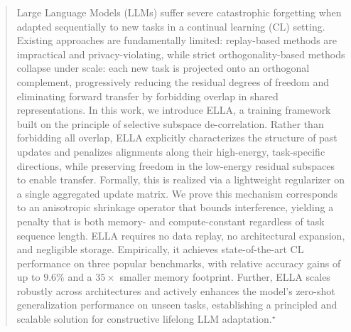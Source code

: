 \documentclass[11pt]{article}
\begin{document}
\begin{abstract}
Large Language Models (LLMs) suffer severe catastrophic forgetting when adapted sequentially to new tasks in a continual learning (CL) setting. Existing approaches are fundamentally limited: replay-based methods are impractical and privacy-violating, while strict orthogonality-based methods collapse under scale: each new task is projected onto an orthogonal complement, progressively reducing the residual degrees of freedom and eliminating forward transfer by forbidding overlap in shared representations. In this work, we introduce ELLA, a training framework built on the principle of selective subspace de-correlation. Rather than forbidding all overlap, ELLA explicitly characterizes the structure of past updates and penalizes alignments along their high-energy, task-specific directions, while preserving freedom in the low-energy residual subspaces to enable transfer. Formally, this is realized via a lightweight regularizer on a single aggregated update matrix. We prove this mechanism corresponds to an anisotropic shrinkage operator that bounds interference, yielding a penalty that is both memory- and compute-constant regardless of task sequence length. ELLA requires no data replay, no architectural expansion, and negligible storage. Empirically, it achieves state-of-the-art CL performance on three popular benchmarks, with relative accuracy gains of up to $9.6\%$ and a $35\times$ smaller memory footprint. Further, ELLA scales robustly across architectures and %
actively enhances the model's zero-shot generalization performance on unseen tasks, establishing a principled and scalable solution for constructive lifelong LLM adaptation.$^\star$
\end{abstract}
\end{document}
